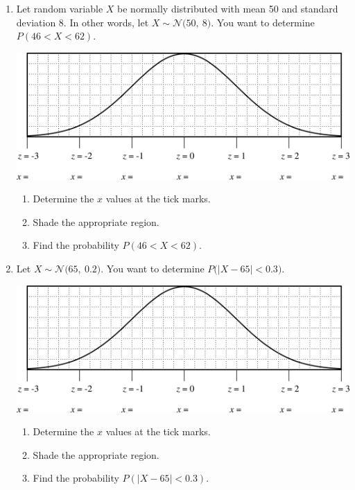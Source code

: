 \documentclass[12pt,letterpaper]{article}
\begin{document}
\newcommand{\N}[2]{\mathcal{N}\Big(#1,~ #2\Big)}
\begin{enumerate}
\item Let random variable $X$ be normally distributed with mean 50 and standard deviation 8.
In other words, let $X \sim \N{50}{8}$. You want to determine $P(46 < X < 62)$.
\begin{center}
\includegraphics[scale=0.8]{curve.png}
\end{center}
\begin{enumerate}
\item Determine the $x$ values at the tick marks.
\item Shade the appropriate region.
\item Find the probability $P(46 < X < 62)$.
\end{enumerate}

\vfill

\item Let $X \sim \N{65}{0.2}$. You want to determine $P\Big(\big|X-65\big| < 0.3\Big)$.
\begin{center}
\includegraphics[scale=0.8]{curve.png}
\end{center}
\begin{enumerate}
\item Determine the $x$ values at the tick marks.
\item Shade the appropriate region.
\item Find the probability $P(|X-65| < 0.3)$.
\end{enumerate}


\end{enumerate}
\end{document}
